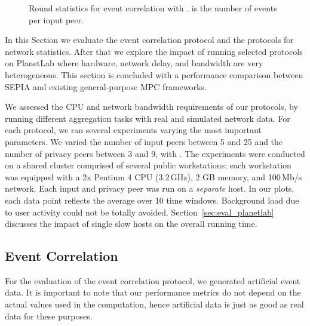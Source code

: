 \documentclass[letterpaper,11pt,onecolumn,titlepage]{article}
\begin{document}
\begin{figure*}[t]
  \centering
	\caption{Round statistics for event correlation with .  is the number of events per input peer. }
	\label{fig:eventeval}
\end{figure*}


In this Section we evaluate the event correlation protocol and the 
protocols for network statistics. After that we explore the impact of
running selected protocols on PlanetLab where hardware, network delay, and bandwidth are very heterogeneous.
This section is concluded with a performance comparison between SEPIA and existing general-purpose MPC frameworks.

We assessed the CPU and network bandwidth requirements of our
protocols, by running different aggregation tasks with real and simulated network data.
For each protocol, we ran several experiments
varying the most important parameters. We varied the number of input peers  between 5 and 25
and the number of privacy peers  between 3 and 9, with . The experiments were conducted
on a shared cluster comprised of several public workstations;
each workstation was equipped with a 2x Pentium 4 CPU (3.2\,GHz),
2 GB memory, and 100\,Mb/s network. Each input and privacy peer was run on a \emph{separate} host.
In our plots, each data point reflects the average over 10 time windows. Background load due to user activity could not be totally avoided. 
Section~\ref{sec:eval_planetlab} discusses  
the impact of single slow hosts on the overall running time.


\subsection{Event Correlation} 
\label{sec:eval_event}

For the evaluation of the event correlation protocol, we generated artificial event data. 
It is important to note that our performance metrics do not depend on the
actual values used in the computation, hence artificial data is just as good as real data for these purposes.
\end{document}
